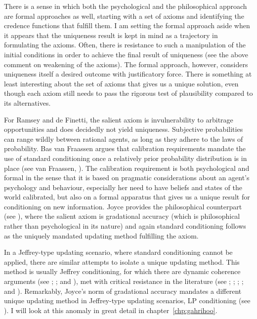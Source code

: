 \documentclass[phd,12pt,oneside]{ubcthesis}
\begin{document}
There is a sense in which both the psychological and the philosophical
approach are formal approaches as well, starting with a set of axioms
and identifying the credence functions that fulfill them. I am setting
the formal approach aside when it appears that the uniqueness result
is kept in mind as a trajectory in formulating the axioms. Often,
there is resistance to such a manipulation of the initial conditions
in order to achieve the final result of uniqueness (see the above
comment on weakening of the axioms). The formal approach, however,
considers uniqueness itself a desired outcome with justificatory
force. There is something at least interesting about the set of axioms
that gives us a unique solution, even though each axiom still needs to
pass the rigorous test of plausibility compared to its alternatives.

For Ramsey and de Finetti, the salient axiom is invulnerability to
arbitrage opportunities and does decidedly not yield uniqueness.
Subjective probabilities can range wildly between rational agents, as
long as they adhere to the laws of probability. Bas van Fraassen
argues that calibration requirements mandate the use of standard
conditioning once a relatively prior probability distribution is in
place (see van Fraassen, ). The calibration
requirement is both psychological and formal in the sense that it is
based on pragmatic considerations about an agent's psychology and
behaviour, especially her need to have beliefs and states of the world
calibrated, but also on a formal apparatus that gives us a unique
result for conditioning on new information. Joyce provides the
philosophical counterpart (see ), where the
salient axiom is gradational accuracy (which is philosophical rather
than psychological in its nature) and again standard conditioning
follows as the uniquely mandated updating method fulfilling the axiom.

In a Jeffrey-type updating scenario, where standard conditioning
cannot be applied, there are similar attempts to isolate a unique
updating method. This method is usually Jeffrey conditioning, for
which there are dynamic coherence arguments (see
; ; and
), met with critical resistance in the literature
(see ; ;
; ; and
). Remarkably, Joyce's norm of gradational
accuracy mandates a different unique updating method in Jeffrey-type
updating scenarios, LP conditioning (see
). I will look at this anomaly in
great detail in chapter~\ref{chp:gahrihoo}.
\end{document}
